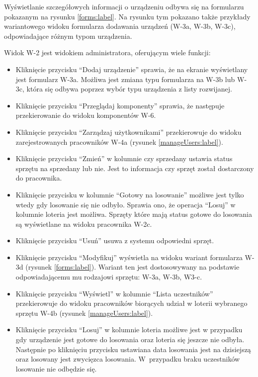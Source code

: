 Wyświetlanie szczegółowych informacji o urządzeniu odbywa się na formularzu pokazanym na rysunku \ref{forms:label}. Na rysunku tym pokazano także przykłady wariantowego widoku formularza dodawania urządzeń (W-3a, W-3b, W-3c), odpowiadające różnym typom urządzenia. 


Widok W-2 jest widokiem administratora, oferującym wiele funkcji:
\begin{itemize}
	\item Kliknięcie przycisku "`Dodaj urządzenie"' sprawia, że na ekranie wyświetlany jest formularz W-3a. Możliwa jest zmiana typu formularza na W-3b lub W-3c, która się odbywa poprzez wybór typu urządzenia z listy rozwijanej.
	\item Kliknięcie przycisku "`Przeglądaj komponenty"' sprawia, że następuje przekierowanie do widoku komponentów W-6.
	\item Kliknięcie przycisku "`Zarządzaj użytkownikami"' przekierowuje do widoku zarejestrowanych pracowników W-4a (rysunek \ref{manageUsers:label}).
	\item Kliknięcie przycisku "`Zmień"' w kolumnie czy sprzedany ustawia status sprzętu na sprzedany lub nie. Jest to informacja czy sprzęt został dostarczony do pracownika.
	\item Kliknięcie przycisku w kolumnie "`Gotowy na losowanie"' możliwe jest tylko wtedy gdy losowanie się nie odbyło. Sprawia ono, że operacja "`Losuj"' w kolumnie loteria jest możliwa. Sprzęty które mają status gotowe do losowania są wyświetlane na widoku pracownika W-2c.
	\item Kliknięcie przycisku "`Usuń"' usuwa z systemu odpowiedni sprzęt.
	\item Kliknięcie przycisku "`Modyfikuj"' wyświetla na widoku wariant formularza W-3d (rysunek \ref{forms:label}). Wariant ten jest dostosowywany na podstawie odpowiadającemu mu rodzajowi sprzętu: W-3a, W-3b, W3-c.
	\item Kliknięcie przycisku "`Wyświetl"' w kolumnie "`Lista uczestników"' przekierowuje do widoku pracowników biorących udział w loterii wybranego sprzętu W-4b (rysunek \ref{manageUsers:label}).
	\item Kliknięcie przycisku "`Losuj"' w kolumnie loteria możliwe jest w przypadku gdy urządzenie jest gotowe do losowania oraz loteria się jeszcze nie odbyła. Następnie po kliknięciu przycisku ustawiana data losowania jest na dzisiejszą oraz losowany jest zwycięzca losowania. W~przypadku braku uczestników losowanie nie odbędzie się.
\end{itemize}
